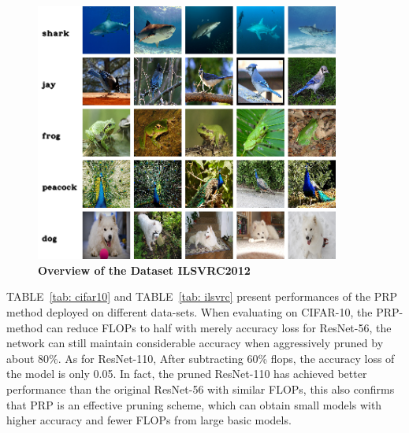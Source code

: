 \documentclass[journal,article,submit,pdftex,moreauthors]{Definitions/mdpi}
\begin{document}
\begin{figure} [h]
	\centering
	\includegraphics[width=10cm]{figs/ILSVRC.png}
    \captionsetup{justification=centering}
	\caption{\textbf{Overview of the Dataset ILSVRC2012}}
	\label{fig: ILSVRC}
\end{figure}



TABLE~\ref{tab: cifar10} and TABLE~\ref{tab: ilsvrc} present performances of the PRP method deployed on different data-sets. When evaluating on CIFAR-10, the PRP-method can reduce FLOPs to half with merely accuracy loss for ResNet-56, the network can still maintain considerable accuracy when aggressively pruned by about 80{$\%$}. As for ResNet-110, After subtracting 60\% flops, the accuracy loss of the model is only 0.05. In fact, the pruned ResNet-110 has achieved better performance than the original ResNet-56 with similar FLOPs, this also confirms that PRP is an effective pruning scheme, which can obtain small models with higher accuracy and fewer FLOPs from large basic models.
\end{document}
